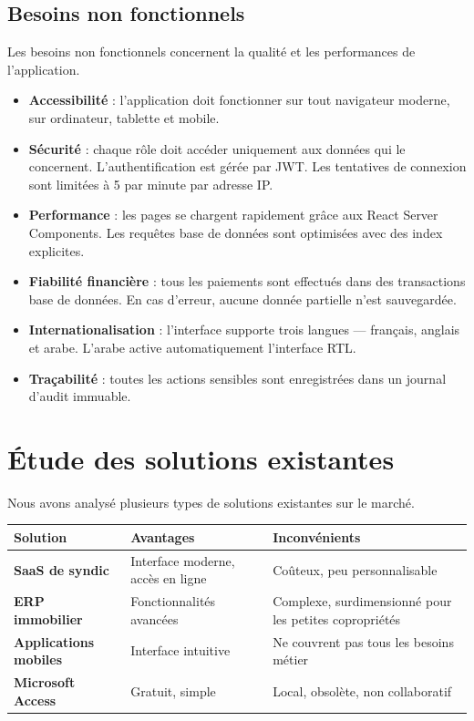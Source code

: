 \documentclass[12pt, a4paper]{report}
\begin{document}
\subsection{Besoins non fonctionnels}

Les besoins non fonctionnels concernent la qualité et les performances de l'application.

\begin{itemize}
  \item \textbf{Accessibilité} : l'application doit fonctionner sur tout navigateur moderne, sur ordinateur, tablette et mobile.
  \item \textbf{Sécurité} : chaque rôle doit accéder uniquement aux données qui le concernent. L'authentification est gérée par JWT. Les tentatives de connexion sont limitées à 5 par minute par adresse IP.
  \item \textbf{Performance} : les pages se chargent rapidement grâce aux React Server Components. Les requêtes base de données sont optimisées avec des index explicites.
  \item \textbf{Fiabilité financière} : tous les paiements sont effectués dans des transactions base de données. En cas d'erreur, aucune donnée partielle n'est sauvegardée.
  \item \textbf{Internationalisation} : l'interface supporte trois langues — français, anglais et arabe. L'arabe active automatiquement l'interface RTL.
  \item \textbf{Traçabilité} : toutes les actions sensibles sont enregistrées dans un journal d'audit immuable.
\end{itemize}

\section{Étude des solutions existantes}

Nous avons analysé plusieurs types de solutions existantes sur le marché.

\begin{center}
\begin{tabularx}{\textwidth}{|>{\bfseries}l|>{\raggedright\arraybackslash}X|>{\raggedright\arraybackslash}X|}
  \hline
  \rowcolor{accentbg}
  \textbf{Solution} & \textbf{Avantages} & \textbf{Inconvénients} \\
  \hline
  SaaS de syndic & Interface moderne, accès en ligne & Coûteux, peu personnalisable \\
  \hline
  ERP immobilier & Fonctionnalités avancées & Complexe, surdimensionné pour les petites copropriétés \\
  \hline
  Applications mobiles & Interface intuitive & Ne couvrent pas tous les besoins métier \\
  \hline
  Microsoft Access & Gratuit, simple & Local, obsolète, non collaboratif \\
  \hline
\end{tabularx}
\end{center}
\end{document}
